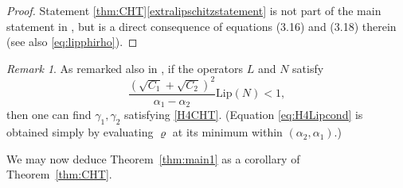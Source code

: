 \documentclass[a4paper, 12pt, oneside, reqno, notitlepage]{amsart}
\theoremstyle{plain}
\theoremstyle{definition}
\theoremstyle{remark}
\newtheorem{remark}[theorem]{Remark}
\begin{document}
\begin{proof}
Statement \ref{thm:CHT}\ref{extralipschitzstatement} is not part of the main statement in \cite{chen1997invariant}, but is a direct consequence of equations (3.16) and (3.18) therein (see also \eqref{eq:lipphirho}).
\end{proof}

\begin{remark}\label{remark:altcondCHT}
As remarked also in \cite{chen1997invariant}, if the operators $L$ and $N$ satisfy
\begin{equation}
    \frac{(\sqrt{C_1}+\sqrt{C_2})^2}{\alpha_1 - \alpha_2} \mathrm{Lip} ( N ) < 1,
    \label{eq:H4Lipcond}
\end{equation}
then one can find $\gamma_1,\gamma_2$ satisfying \ref{H4CHT}.
(Equation \eqref{eq:H4Lipcond} is obtained simply by evaluating $\varrho$ at its minimum within $(\alpha_2,\alpha_1)$.)
\end{remark}


We may now deduce Theorem~\ref{thm:main1} as a corollary of Theorem~\ref{thm:CHT}.
\end{document}
